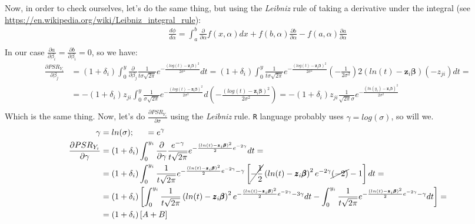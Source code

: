 \documentclass[]{article}
\begin{document}
Now, in order to check ourselves, let's do the same thing, but using the \emph{Leibniz} rule of taking a derivative under the integral (see \url{https://en.wikipedia.org/wiki/Leibniz_integral_rule}):
  $$
  \begin{aligned}
    \frac{d\phi}{d\alpha} = \int_a^b   \frac{\partial}{\partial\alpha}f(x, \alpha)dx +  f(b, \alpha)\frac{\partial b}{\partial\alpha}  - f(a, \alpha)\frac{\partial a}{\partial\alpha} \\
  \end{aligned}
  $$
In our case $\frac{\partial a}{\partial\beta_i} = \frac{\partial b}{\partial\beta_i} = 0$, so we have:
  $$
  \begin{aligned}
    \frac{\partial PSR_{Y_i}}{\partial \beta_j} &=(1+\delta_i) \int_0^y  \frac{\partial}{\partial \beta_j}  \frac{1}{t \sigma\sqrt{2 \pi }} e^{-\frac{(log(t) - \pmb{z}_i\pmb{\beta})^2}{2\sigma^2}} dt = (1+\delta_i) \int_0^y   \frac{1}{t \sigma\sqrt{2 \pi }} e^{-\frac{(log(t) - \pmb{z}_i\pmb{\beta})^2}{2\sigma^2}}  \left(   -\frac{1}{2\sigma^2}   \right)  2(ln(t) - \pmb{z}_i\pmb{\beta})(-z_{ji})dt  =\\
    &= -(1+\delta_i)z_{ji} \int_0^y   \frac{1}{\sigma\sqrt{2 \pi }} e^{-\frac{(log(t) - \pmb{z}_i\pmb{\beta})^2}{2\sigma^2}}  d\left(   -\frac{(log(t) - \pmb{z}_i\pmb{\beta})^2}{2\sigma^2}   \right) =  -(1+\delta_i)z_{ji}  \frac{1}{\sqrt{2\pi} \sigma}    e^{ - \frac{\left( ln(y_i) -\pmb{z}_i\pmb{\beta} \right)^2}{2\sigma^2} }\\
  \end{aligned}
  $$
Which is the same thing. Now, let's do $\frac{\partial PSR_{Y_i}}{\partial \sigma}$ using the \emph{Leibniz} rule. \texttt{R} language probably uses $\gamma = log(\sigma)$, so will we. 
  $$
  \begin{aligned}
    \gamma &= ln(\sigma);~~~~~  = e^{\gamma}\\
    \frac{\partial PSR_{Y_i}}{\partial \gamma} &=(1+\delta_i) \int_0^{y_i}  \frac{\partial}{\partial \gamma}  \frac{e^{-\gamma}}{t \sqrt{2 \pi }} e^{-\frac{(ln(t) - \pmb{z}_i\pmb{\beta})^2}{2}e^{-2\gamma}} dt = \\
    &=(1+\delta_i) \int_0^{y_i}   \frac{1}{t \sqrt{2 \pi }} e^{-\frac{(ln(t) - \pmb{z}_i\pmb{\beta})^2}{2}e^{-2\gamma} - \gamma} \left[   \cancel{-\frac{1}{2}} \left(  ln(t) -  \pmb{z}_i\pmb{\beta}  \right)^2  e^{-2\gamma}\cancel{(-2)} - 1  \right] dt  =\\
    &=(1+\delta_i) \left[       \int_0^{y_i}   \frac{1}{t \sqrt{2 \pi }}  \left(  ln(t) -  \pmb{z}_i\pmb{\beta}  \right)^2 e^{-\frac{(ln(t) - \pmb{z}_i\pmb{\beta})^2}{2}e^{-2\gamma} - 3\gamma} dt     -     \int_0^{y_i}   \frac{1}{t \sqrt{2 \pi }}  e^{-\frac{(ln(t) - \pmb{z}_i\pmb{\beta})^2}{2}e^{-2\gamma} - \gamma}  dt  \right] = \\
    & =(1+\delta_i) \left[       A + B  \right]
  \end{aligned}
  $$
\end{document}
